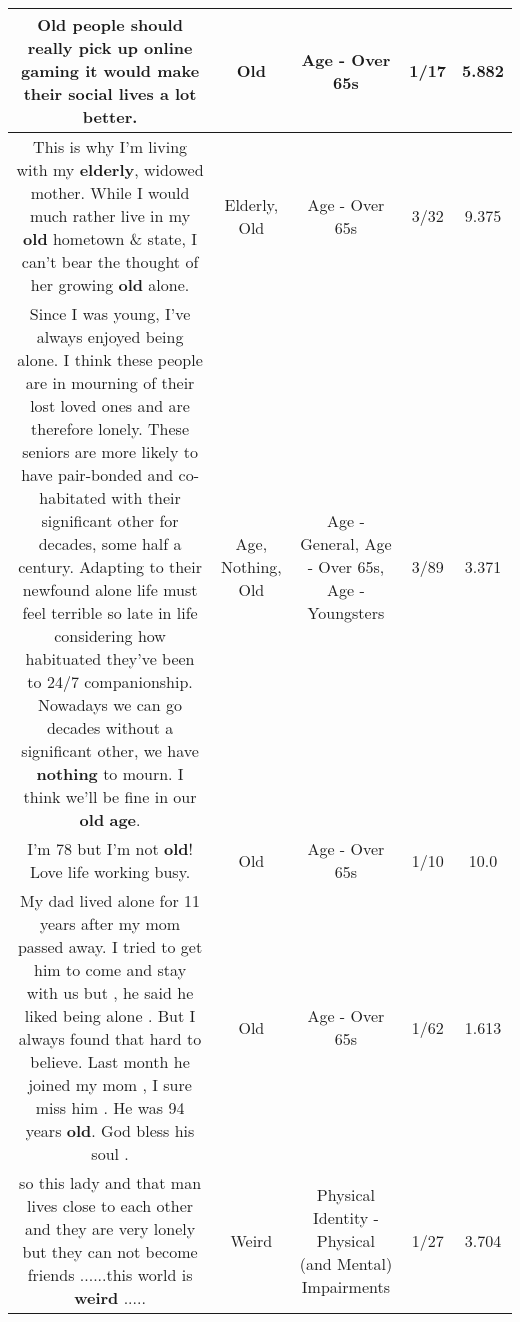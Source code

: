 \documentclass[11pt]{article}
\newlength\mylength
\begin{document}
\begin{center}
\begin{longtable}{|C{.65\mylength}|C{.30\mylength}|C{.12\mylength}|C{.12\mylength}|C{.12\mylength}|}
  \small Old people should really pick up online gaming it would make their social lives a lot better.\normalsize   & Old & Age - Over 65s & 1/17 & 5.882 \\  \hline
  \small This is why I'm living with my \textbf{elderly}, widowed mother. While I would much rather live in my \textbf{old} hometown \& state, I can't bear the thought of her growing \textbf{old} alone.\normalsize   & Elderly, Old & Age - Over 65s & 3/32 & 9.375 \\  \hline
  \small Since I was young, I've always enjoyed being alone. I think these people are in mourning of their lost loved ones and are therefore lonely.  These seniors are more likely to have pair-bonded and co-habitated with their significant other for decades, some half a century.  Adapting to their newfound alone life must feel terrible so late in life considering how habituated they've been to 24/7 companionship.  Nowadays we can go decades without a significant other, we have \textbf{nothing} to mourn.  I think we'll be fine in our \textbf{old} \textbf{age}.\normalsize   & Age, Nothing, Old & Age - General, Age - Over 65s, Age - Youngsters & 3/89 & 3.371 \\  \hline
  \small I'm 78 but I'm not \textbf{old}! Love life working busy.\normalsize   & Old & Age - Over 65s & 1/10 & 10.0 \\  \hline
  \small My dad lived alone for 11 years  after my mom passed away.  I tried to get him to come and stay with us but , he said he liked being alone . But I  always found that hard to believe.  Last month he joined my mom , I sure miss him . He was 94 years \textbf{old}.  God bless his soul  .\normalsize   & Old & Age - Over 65s & 1/62 & 1.613 \\  \hline
  \small so this lady and that man lives  close to each other  and they are very lonely but they can not become friends ......this world is \textbf{weird} .....\normalsize   & Weird & Physical Identity - Physical (and Mental) Impairments & 1/27 & 3.704 \\  \hline

\end{longtable}
\end{center}
\end{document}
